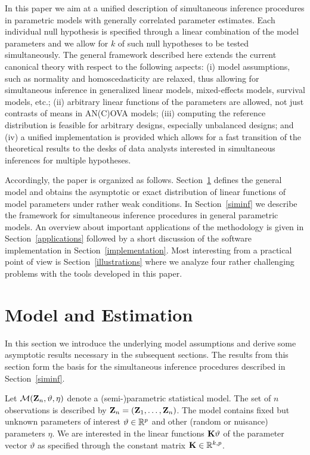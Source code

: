 \documentclass[12pt]{article}
\begin{document}
In this paper we aim at a unified description of simultaneous
inference procedures in parametric models with generally correlated parameter estimates.
Each individual null hypothesis is specified through a linear
combination of the model parameters and we allow
for $k$ of such null hypotheses to be tested simultaneously.
The general framework described here extends the current canonical theory
with respect to the following aspects: (i) model assumptions, such as normality
and homoscedasticity
are relaxed, thus allowing for simultaneous inference
in generalized linear models, mixed-effects models,
survival models, etc.; (ii) arbitrary linear functions of the
parameters are allowed, not just contrasts of means in AN(C)OVA models; (iii)
computing the reference distribution is feasible for arbitrary designs,
especially unbalanced designs; and (iv)
a unified implementation is provided which allows for a fast transition of the
theoretical results to the desks of data analysts interested
in simultaneous inferences for multiple hypotheses.

Accordingly, the paper is organized as follows.
Section~\ref{model} defines the general model and obtains
the asymptotic or exact distribution of linear functions
of model parameters under rather weak conditions.
In Section~\ref{siminf} we
describe the framework for simultaneous inference
procedures in general parametric models. An overview about important applications
of the methodology is given in Section~\ref{applications} followed
by a short discussion of the software implementation in Section~\ref{implementation}.
Most interesting from a practical point of view is
Section~\ref{illustrations} where we analyze four rather challenging
problems with the tools developed in this paper.


\section{Model and Estimation} \label{model}

In this section we introduce the underlying model assumptions
and derive some asymptotic results necessary in the subsequent sections.
The results from this section form the basis for the
simultaneous inference procedures described in Section~\ref{siminf}.

Let $\mathcal{M}(\mathbf{Z}_n, \vartheta, \eta)$ denote a (semi-)parametric statistical
model.
The set of $n$ observations is described by $\mathbf{Z}_n = (\mathbf{Z}_1, \dots, \mathbf{Z}_n)$.
The model contains fixed
but unknown parameters of interest $\vartheta \in \mathbb{R}^p$
and other (random or nuisance) parameters $\eta$.
We are interested in the linear
functions $\mathbf{K} \vartheta$
of the parameter vector $\vartheta$ as specified through the constant matrix
$\mathbf{K} \in \mathbb{R}^{k, p}$.
\end{document}
